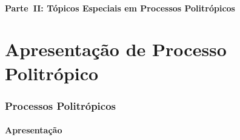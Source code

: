 
\subsection{Parte~II: Tópicos Especiais em Processos Politrópicos}


\part{Apresentação de Processo Politrópico}

\section{Processos Politrópicos}

\subsection{Apresentação}

